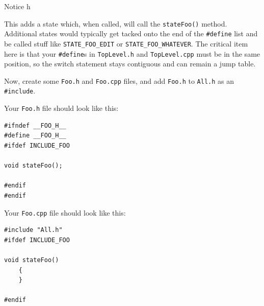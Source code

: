 \documentclass{article}
\begin{document}
Notice h

This adds a state which, when called, will call the \texttt{stateFoo()} method.  Additional states would typically 
get tacked onto the end of the \texttt{\#define} list and be called stuff like \texttt{STATE\_FOO\_EDIT} or \texttt{STATE\_FOO\_WHATEVER}.  
The critical item here is that your \texttt{\#define}s in \texttt{TopLevel.h} and \texttt{TopLevel.cpp} must be in the same position,
so the switch statement stays contiguous and can remain a jump table.

Now, create some \texttt{Foo.h} and \texttt{Foo.cpp} files, and add \texttt{Foo.h} to \texttt{All.h} as an \texttt{\#include}.
 
 Your \texttt{Foo.h} file should look like this:
 
 \begin{verbatim}
#ifndef __FOO_H__
#define __FOO_H__ 
#ifdef INCLUDE_FOO

void stateFoo();

#endif
#endif
\end{verbatim}

Your \texttt{Foo.cpp} file should look like this:

\begin{verbatim}
#include "All.h"
#ifdef INCLUDE_FOO

void stateFoo()
    {
    }

#endif
\end{verbatim}
\end{document}
